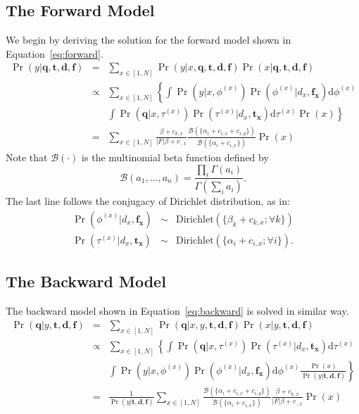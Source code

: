 \subsection{The Forward Model}
We begin by deriving the solution for the forward model shown in
Equation~\eqref{eq:forward}. 
\begin{eqnarray}
  \Pr(y|\mathbf{q}, \mathbf{t}, \mathbf{d}, \mathbf{f}) 
  &=& \sum_{x \in [1, N]} \Pr(y|x, \mathbf{q}, \mathbf{t}, \mathbf{d}, \mathbf{f}) \Pr(x|\mathbf{q}, \mathbf{t}, \mathbf{d}, \mathbf{f}) \nonumber\\
  &\propto& \sum_{x \in [1, N]} \left\{ \int \Pr(y|x, \phi^{(x)}) \Pr(\phi^{(x)}|d_x, \mathbf{f_x}) \mathrm{d}\phi^{(x)} \right. \nonumber\\
  && \left. \int \Pr(\mathbf{q}| x, \tau^{(x)}) \Pr(\tau^{(x)}|d_x, \mathbf{t_x})\mathrm{d}\tau^{(x)} \Pr(x) \right\} \nonumber\\
  &=& \sum_{x \in [1, N]} \frac{\beta + c_{k,x}}{|F|\beta + c_{\cdot,x}} \frac{\mathcal{B}(\{\alpha_i + c_{i,x} + c_{i,q} \})}{\mathcal{B}(\{\alpha_i + c_{i,x} \})} \Pr(x)
\end{eqnarray}
Note that $\mathcal{B}(\cdot)$ is the multinomial beta
function defined by \[\mathcal{B}(a_1, \ldots, a_n) = \frac{\prod_i
\Gamma(a_i)}{\Gamma(\sum_i a_i)}. \]
The last line follows the conjugacy of Dirichlet distribution, as in:
\begin{eqnarray*}
\Pr(\phi^{(x)}|d_x,\mathbf{f_x}) &\sim& \mathrm{Dirichlet}(\{\beta_k + c_{k,x}; \forall k \}) \\
\Pr(\tau^{(x)}|d_x, \mathbf{t_x}) &\sim& \mathrm{Dirichlet}(\{\alpha_i + c_{i,x}; \forall i \}).
\end{eqnarray*}

\subsection{The Backward Model}
The backward model shown in Equation~\eqref{eq:backward} is solved in similar way.
\begin{eqnarray}
  \Pr(\mathbf{q}|y, \mathbf{t}, \mathbf{d}, \mathbf{f}) 
  &=& \sum_{x \in [1, N]} \Pr(\mathbf{q}|x, y, \mathbf{t}, \mathbf{d}, \mathbf{f}) \Pr(x|y, \mathbf{t}, \mathbf{d}, \mathbf{f}) \nonumber\\
  &\propto& \sum_{x \in [1, N]} \left\{ \int \Pr(\mathbf{q}|x, \tau^{(x)}) \Pr(\tau^{(x)}|d_x, \mathbf{t_x}) \mathrm{d}\tau^{(x)} \right. \nonumber\\
  && \left. \int \Pr(y| x, \phi^{(x)}) \Pr(\phi^{(x)}|d_x, \mathbf{f_x})\mathrm{d}\phi^{(x)} \frac{\Pr(x)}{\Pr(y|\mathbf{t}, \mathbf{d}, \mathbf{f})} \right\} \nonumber\\
  &=& \frac{1}{\Pr(y|\mathbf{t}, \mathbf{d}, \mathbf{f})} \sum_{x \in [1, N]} \frac{\mathcal{B}(\{\alpha_i + c_{i,x} + c_{i,q} \})}{\mathcal{B}(\{\alpha_i + c_{i,x} \})} \frac{\beta + c_{k,x}}{|F|\beta + c_{\cdot,x}} \Pr(x) \nonumber
\end{eqnarray}

